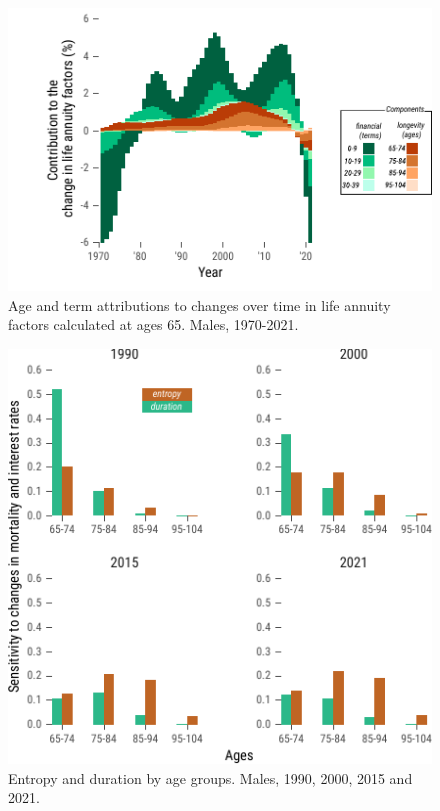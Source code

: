 \documentclass[12pt]{article}
\begin{document}
\begin{figure}[!ht]
	\centering
	\includegraphics[width=0.8\linewidth]{Fig/ageTermStructureDescomposition}
	\caption{{Age and term attributions to changes over time in life annuity factors calculated at ages 65. Males, 1970-2021.}}
	\label{fig:Fig5}
\end{figure}


\begin{figure}[!ht]
	\centering
	\includegraphics[width=0.8\linewidth]{Fig/attributionEntropyDuration}
	\caption{{Entropy and duration by age groups. Males, 1990, 2000, 2015 and 2021.}}
	\label{fig:Fig6}
\end{figure}
\end{document}
